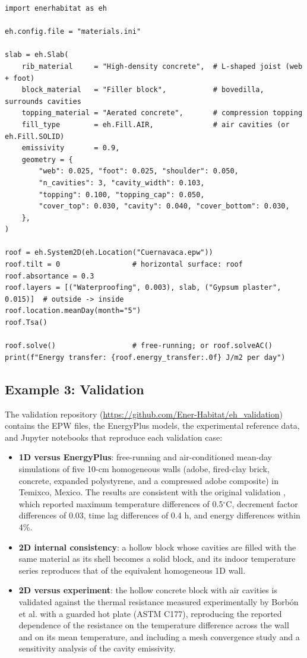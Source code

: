 \documentclass[preprint,12pt, a4paper]{elsarticle}
\begin{document}
\begin{lstlisting}[caption={Evaluation of a joist-and-block roof with the 2D solver}]
import enerhabitat as eh

eh.config.file = "materials.ini"

slab = eh.Slab(
    rib_material     = "High-density concrete",  # L-shaped joist (web + foot)
    block_material   = "Filler block",           # bovedilla, surrounds cavities
    topping_material = "Aerated concrete",       # compression topping
    fill_type        = eh.Fill.AIR,              # air cavities (or eh.Fill.SOLID)
    emissivity       = 0.9,
    geometry = {
        "web": 0.025, "foot": 0.025, "shoulder": 0.050,
        "n_cavities": 3, "cavity_width": 0.103,
        "topping": 0.100, "topping_cap": 0.050,
        "cover_top": 0.030, "cavity": 0.040, "cover_bottom": 0.030,
    },
)

roof = eh.System2D(eh.Location("Cuernavaca.epw"))
roof.tilt = 0                 # horizontal surface: roof
roof.absortance = 0.3
roof.layers = [("Waterproofing", 0.003), slab, ("Gypsum plaster", 0.015)]  # outside -> inside
roof.location.meanDay(month="5")
roof.Tsa()

roof.solve()                  # free-running; or roof.solveAC()
print(f"Energy transfer: {roof.energy_transfer:.0f} J/m2 per day")
\end{lstlisting}

\subsection{Example 3: Validation}

The validation repository (\url{https://github.com/Ener-Habitat/eh_validation}) contains the EPW files, the EnergyPlus models, the experimental reference data, and Jupyter notebooks that reproduce each validation case:

\begin{itemize}
    \item \textbf{1D versus EnergyPlus}: free-running and air-conditioned mean-day simulations of five 10-cm homogeneous walls (adobe, fired-clay brick, concrete, expanded polystyrene, and a compressed adobe composite) in Temixco, Mexico. The results are consistent with the original validation \cite{barrios2016enerhabitat}, which reported maximum temperature differences of 0.5$^\circ$C, decrement factor differences of 0.03, time lag differences of 0.4 h, and energy differences within 4\%.
    \item \textbf{2D internal consistency}: a hollow block whose cavities are filled with the same material as its shell becomes a solid block, and its indoor temperature series reproduces that of the equivalent homogeneous 1D wall.
    \item \textbf{2D versus experiment}: the hollow concrete block with air cavities is validated against the thermal resistance measured experimentally by Borb\'on et al. \cite{borbon2010} with a guarded hot plate (ASTM C177), reproducing the reported dependence of the resistance on the temperature difference across the wall and on its mean temperature, and including a mesh convergence study and a sensitivity analysis of the cavity emissivity.
\end{itemize}
\end{document}
